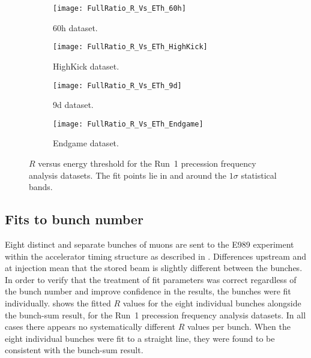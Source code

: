 \begin{figure}
\centering
    \begin{subfigure}[]{0.41\textwidth}
        \centering
        \texttt{[image: FullRatio\_R\_Vs\_ETh\_60h]}
        \caption{60h dataset.}
    \end{subfigure}%
    \begin{subfigure}[]{0.41\textwidth}
        \centering
        \texttt{[image: FullRatio\_R\_Vs\_ETh\_HighKick]}
        \caption{HighKick dataset.}
    \end{subfigure}

    \begin{subfigure}[]{0.41\textwidth}
        \centering
        \texttt{[image: FullRatio\_R\_Vs\_ETh\_9d]}
        \caption{9d dataset.}
    \end{subfigure}%
    \begin{subfigure}[]{0.41\textwidth}
        \centering
        \texttt{[image: FullRatio\_R\_Vs\_ETh\_Endgame]}
        \caption{Endgame dataset.}
    \end{subfigure}
\caption[$R$ versus energy threshold]{$R$ versus energy threshold for the Run~1 precession frequency analysis datasets. The fit points lie in and around the $1\sigma$ statistical bands.}
\label{fig:energyThresholdScan_R}
\end{figure}





\subsection{Fits to bunch number}

Eight distinct and separate bunches of muons are sent to the E989 experiment within the accelerator timing structure as described in . Differences upstream and at injection mean that the stored beam is slightly different between the bunches. In order to verify that the treatment of fit parameters was correct regardless of the bunch number and improve confidence in the results, the bunches were fit individually.  shows the fitted $R$ values for the eight individual bunches alongside the bunch-sum result, for the Run~1 precession frequency analysis datasets. In all cases there appears no systematically different $R$ values per bunch. When the eight individual bunches were fit to a straight line, they were found to be consistent with the bunch-sum result.


